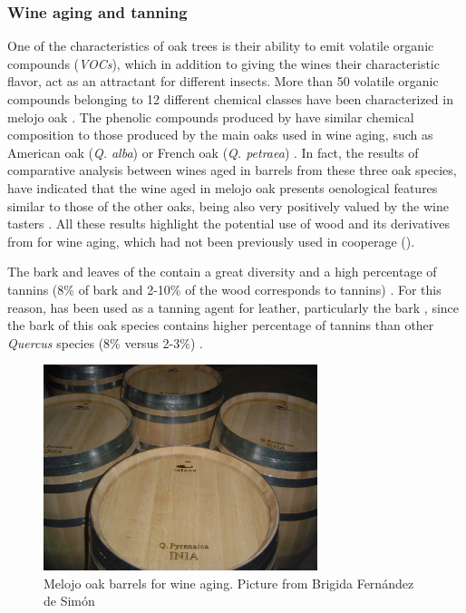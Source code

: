 \subsubsection{Wine aging and tanning}\label{sec:es:provision-wine}
One of the characteristics of oak trees is their ability to emit volatile organic compounds (\emph{VOCs}), which in addition to giving the wines their characteristic flavor, act as an attractant for different insects. More than 50 volatile organic compounds belonging to 12 different chemical classes have been characterized in melojo oak \autocites{Ramiloetal2017VolatileOrganic}. The phenolic compounds produced by \Qp have similar chemical composition to those produced by the main oaks used in wine aging, such as American oak (\emph{Q. alba}) or French oak (\emph{Q. petraea}) \autocites{Gallegoetal2012PhenolicCompounds}. In fact, the results of comparative analysis between wines aged in barrels from these three oak species, have indicated that the wine aged in melojo oak presents oenological features similar to those of the other oaks, being also very positively valued by the wine tasters \autocites{CadahiaFernandezdeSimon2004UtilizacionRoble,FernandezdeSimonetal2008VolatileCompounds,FernandezdeSimonetal2009VolatileCompounds}. All these results highlight the potential use of wood and its derivatives from \Qp for wine aging, which had not been previously used in cooperage \autocites{Gallego2013EstudioPotencial,MartinezGiletal2020EffectSize} (). 

The bark and leaves of the \Qp contain a great diversity and a high percentage of tannins (8\% of bark and 2-10\% of the wood corresponds to tannins) \autocites{FernandezdeSimonetal2006ChemicalCharacterization,Doceetal2007EffectImmature,TornerOchoa1952CurtientesVegetales}. For this reason, \Qp has been used as a tanning agent for leather, particularly the bark \autocites{TornerOchoa1952CurtientesVegetales}, since the bark of this oak species contains higher percentage of tannins than other \emph{Quercus} species (8\% versus 2-3\%) \autocites{TornerOchoa1952CurtientesVegetales}.

\begin{figure}
    \centering
    \includegraphics[height=6cm]{img/es/es-barrica.jpg}\caption{Melojo oak barrels for wine aging. Picture from Brigida Fernández de Simón}\label{fig:es:barrica}
\end{figure}

